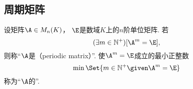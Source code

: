 \subsection{周期矩阵}
\begin{definition}
设矩阵\(\A \in M_n(K)\)，
\(\E\)是数域\(K\)上的\(n\)阶单位矩阵.
若\[
	(\exists m\in\mathbb{N}^+)
	[\A^m = \E],
\]
则称“\(\A\)是（periodic matrix）”.
使\(\A^m = \E\)成立的最小正整数\[
	\min\Set{ m\in\mathbb{N}^+ \given \A^m = \E }
\]称为“\(\A\)的”.
\end{definition}

